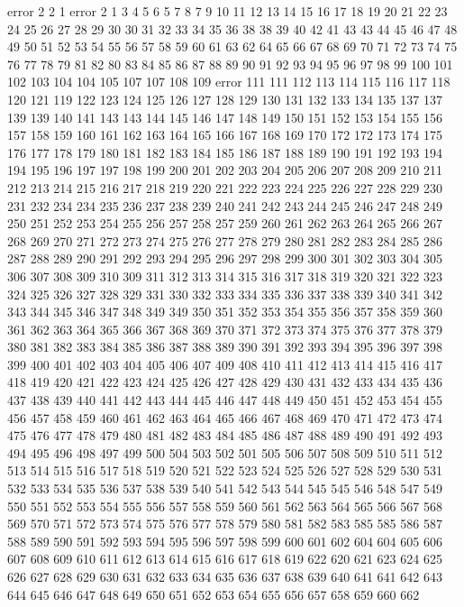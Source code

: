 error
2
2
1
error
2
1
3
4
5
6
5
7
8
7
9
10
11
12
13
14
15
16
17
18
19
20
21
22
23
24
25
26
27
28
29
30
30
31
32
33
34
35
36
38
38
39
40
42
41
43
43
44
45
46
47
48
49
50
51
52
53
54
55
56
57
58
59
60
61
63
62
64
65
66
67
68
69
70
71
72
73
74
75
76
77
78
79
81
82
80
83
84
85
86
87
88
89
90
91
92
93
94
95
96
97
98
99
100
101
102
103
104
104
105
107
107
108
109
error
111
111
112
113
114
115
116
117
118
120
121
119
122
123
124
125
126
127
128
129
130
131
132
133
134
135
137
137
139
139
140
141
143
143
144
145
146
147
148
149
150
151
152
153
154
155
156
157
158
159
160
161
162
163
164
165
166
167
168
169
170
172
172
173
174
175
176
177
178
179
180
181
182
183
184
185
186
187
188
189
190
191
192
193
194
194
195
196
197
197
198
199
200
201
202
203
204
205
206
207
208
209
210
211
212
213
214
215
216
217
218
219
220
221
222
223
224
225
226
227
228
229
230
231
232
234
234
235
236
237
238
239
240
241
242
243
244
245
246
247
248
249
250
251
252
253
254
255
256
257
258
257
259
260
261
262
263
264
265
266
267
268
269
270
271
272
273
274
275
276
277
278
279
280
281
282
283
284
285
286
287
288
289
290
291
292
293
294
295
296
297
298
299
300
301
302
303
304
305
306
307
308
309
310
309
311
312
313
314
315
316
317
318
319
320
321
322
323
324
325
326
327
328
329
331
330
332
333
334
335
336
337
338
339
340
341
342
343
344
345
346
347
348
349
349
350
351
352
353
354
355
356
357
358
359
360
361
362
363
364
365
366
367
368
369
370
371
372
373
374
375
376
377
378
379
380
381
382
383
384
385
386
387
388
389
390
391
392
393
394
395
396
397
398
399
400
401
402
403
404
405
406
407
409
408
410
411
412
413
414
415
416
417
418
419
420
421
422
423
424
425
426
427
428
429
430
431
432
433
434
435
436
437
438
439
440
441
442
443
444
445
446
447
448
449
450
451
452
453
454
455
456
457
458
459
460
461
462
463
464
465
466
467
468
469
470
471
472
473
474
475
476
477
478
479
480
481
482
483
484
485
486
487
488
489
490
491
492
493
494
495
496
498
497
499
500
504
503
502
501
505
506
507
508
509
510
511
512
513
514
515
516
517
518
519
520
521
522
523
524
525
526
527
528
529
530
531
532
533
534
535
536
537
538
539
540
541
542
543
544
545
545
546
548
547
549
550
551
552
553
554
555
556
557
558
559
560
561
562
563
564
565
566
567
568
569
570
571
572
573
574
575
576
577
578
579
580
581
582
583
585
585
586
587
588
589
590
591
592
593
594
595
596
597
598
599
600
601
602
604
604
605
606
607
608
609
610
611
612
613
614
615
616
617
618
619
622
620
621
623
624
625
626
627
628
629
630
631
632
633
634
635
636
637
638
639
640
641
641
642
643
644
645
646
647
648
649
650
651
652
653
654
655
656
657
658
659
660
662
